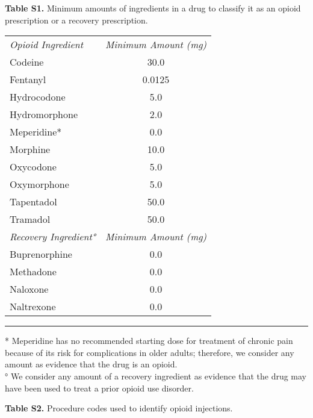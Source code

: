 \documentclass[10pt, letter]{article}
\begin{document}
\nolinenumbers

\newpage

\theendnotes

\newpage

\textbf{Table S1.} Minimum amounts of ingredients in a drug to classify it as an opioid prescription or a recovery prescription.

\begin{tabular}{lc}
\em Opioid Ingredient & \em Minimum Amount (mg) \\[0.5em]
Codeine & 30.0 \\
Fentanyl & 0.0125 \\
Hydrocodone & 5.0 \\
Hydromorphone & 2.0 \\
Meperidine* & 0.0 \\
Morphine & 10.0 \\
Oxycodone & 5.0 \\
Oxymorphone & 5.0 \\
Tapentadol & 50.0 \\
Tramadol & 50.0 \\[1em]
\em Recovery Ingredient° & \em Minimum Amount (mg) \\[0.5em]
Buprenorphine & 0.0 \\
Methadone & 0.0 \\
Naloxone & 0.0 \\
Naltrexone & 0.0 \\[1em]
\end{tabular}

\hrule

\footnotesize
* Meperidine has no recommended starting dose for treatment of chronic pain because of its risk for complications in older adults; therefore, we consider any amount as evidence that the drug is an opioid. \\
° We consider any amount of a recovery ingredient as evidence that the drug may have been used to treat a prior opioid use disorder.
\normalsize

\newpage

\textbf{Table S2.} Procedure codes used to identify opioid injections.
\end{document}
